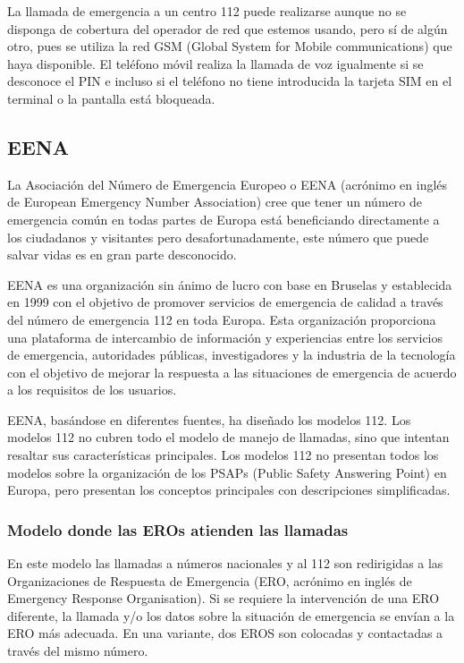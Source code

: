 La llamada de emergencia a un centro 112 puede realizarse aunque no se disponga de cobertura del operador de red que estemos usando, pero sí de algún otro, pues se utiliza la red GSM (Global System for Mobile communications) que haya disponible. El teléfono móvil realiza la llamada de voz igualmente si se desconoce el PIN e incluso si el teléfono no tiene introducida la tarjeta SIM en el terminal o la pantalla está bloqueada.

\subsection{EENA}

La Asociación del Número de Emergencia Europeo o EENA (acrónimo en inglés de European Emergency Number Association) cree que tener un número de emergencia común en todas partes de Europa está beneficiando directamente a los ciudadanos y visitantes pero desafortunadamente, este número que puede salvar vidas es en gran parte desconocido.

EENA es una organización sin ánimo de lucro con base en Bruselas y establecida en 1999 con el objetivo de promover servicios de emergencia de calidad a través del número de emergencia 112 en toda Europa. Esta organización proporciona una plataforma de intercambio de información y experiencias entre los servicios de emergencia, autoridades públicas, investigadores y la industria de la tecnología con el objetivo de mejorar la respuesta a las situaciones de emergencia de acuerdo a los requisitos de los usuarios.

EENA, basándose en diferentes fuentes, ha diseñado los modelos 112. Los modelos 112 no cubren todo el modelo de manejo de llamadas, sino que intentan resaltar sus características principales. Los modelos 112 no presentan todos los modelos sobre la organización de los PSAPs (Public Safety Answering Point) en Europa, pero presentan los conceptos principales con descripciones simplificadas.

\subsubsection{Modelo donde las EROs atienden las llamadas}

En este modelo las llamadas a números nacionales y al 112 son redirigidas a las  Organizaciones de Respuesta de Emergencia (ERO, acrónimo en inglés de Emergency Response Organisation). Si se requiere la intervención de una ERO diferente, la llamada y/o los datos sobre la situación de emergencia se envían a la ERO más adecuada. En una variante, dos EROS son colocadas y contactadas a través del mismo número.

